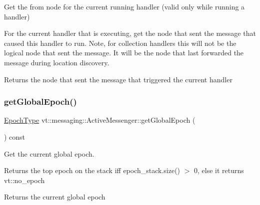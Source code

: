 Get the from node for the current running handler (valid only while running a handler) 

For the current handler that is executing, get the node that sent the message that caused this handler to run. Note, for collection handlers this will not be the logical node that sent the message. It will be the node that last forwarded the message during location discovery.

\begin{DoxyReturn}{Returns}
the node that sent the message that triggered the current handler 
\end{DoxyReturn}
\mbox{\label{structvt_1_1messaging_1_1_active_messenger_abb892a84a906954d8769794ccfb0c638}} 
\subsubsection{\texorpdfstring{get\+Global\+Epoch()}{getGlobalEpoch()}}
{\footnotesize\ttfamily \hyperlink{namespacevt_a985a5adf291c34a3ca263b3378388236}{Epoch\+Type} vt\+::messaging\+::\+Active\+Messenger\+::get\+Global\+Epoch (\begin{DoxyParamCaption}{ }\end{DoxyParamCaption}) const\hspace{0.3cm}{\ttfamily [inline]}}



Get the current global epoch. 

{\ttfamily Returns} the top epoch on the stack iff {\ttfamily epoch\+\_\+stack.\+size()} $>$ 0, else it returns {\ttfamily vt\+::no\+\_\+epoch} 

\begin{DoxyReturn}{Returns}
the current global epoch 
\end{DoxyReturn}
\mbox{\label{structvt_1_1messaging_1_1_active_messenger_a527858e860bb7b373489ae425fd3fdcc}} 
